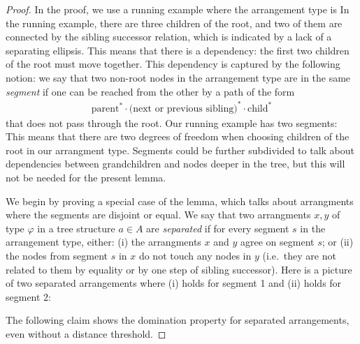\begin{proof}
    In the proof, we use a running example where the  arrangement type is
In the running example, there are three children of the root, and two of them are connected by the sibling successor relation, which is indicated by a lack of a separating ellipsis. This means that there is a dependency: the first two children of the root must move together.  This dependency is captured by the following notion: we say that two  non-root nodes in the arrangement type are in the same \emph{segment}  if one can be reached from the other by a path of the form
\begin{align*}
\text{parent}^* \cdot \text{(next or previous sibling)}^* \cdot \text{child}^*
\end{align*}
that does not pass through the root. Our  running example has two segments:
This means that there are two degrees of freedom when choosing children of the root in our arrangment type.  Segments could be further subdivided to talk about dependencies between grandchildren and nodes deeper in the tree, but this will not be needed for the present lemma.


    We begin by proving a special case of the lemma, which talks about arrangments where the segments are disjoint or equal. We say that two arrangments $x,y$ of type $\varphi$ in a tree structure $a \in A$  are \emph{separated} if for every segment $s$ in the arrangement type, either: (i) the arrangments $x$ and $y$ agree on segment $s$; or (ii) the nodes from segment $s$ in $x$ do not touch any  nodes in $y$  (i.e.~they are not related to them by equality or by one step of  sibling successor). Here is a picture of two separated arrangements where (i) holds for segment 1 and (ii) holds for segment 2:

The following claim shows the domination property for  separated arrangements, even without a distance threshold. 


\end{proof}
